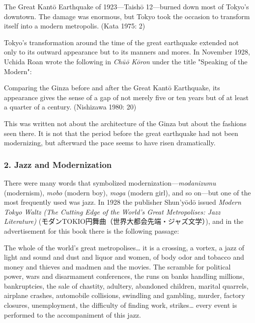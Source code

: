 \begin{gquote}
The Great Kantō Earthquake of 1923—Taishō 12—burned down most of Tokyo's downtown. The damage was enormous, but Tokyo took the occasion to transform itself into a modern metropolis. (Kata 1975: 2)
\end{gquote}

Tokyo's transformation around the time of the great earthquake extended not only to its outward appearance but to its manners and mores. In November 1928, Uchida Roan wrote the following in \textit{Chūō Kōron} under the title "Speaking of the Modern":

\begin{gquote}
Comparing the Ginza before and after the Great Kantō Earthquake, its appearance gives the sense of a gap of not merely five or ten years but of at least a quarter of a century. (Nishizawa 1980: 20)
\end{gquote}

This was written not about the architecture of the Ginza but about the fashions seen there. It is not that the period before the great earthquake had not been modernizing, but afterward the pace seems to have risen dramatically.

\subsubsection{2. Jazz and Modernization}

There were many words that symbolized modernization—\textit{modanizumu} (modernism), \textit{mobo} (modern boy), \textit{moga} (modern girl), and so on—but one of the most frequently used was jazz. In 1928 the publisher Shun'yōdō issued \textit{Modern Tokyo Waltz (The Cutting Edge of the World's Great Metropolises: Jazz Literature)} (モダンTOKIO円舞曲（世界大都会先端・ジャズ文学）), and in the advertisement for this book there is the following passage:

\begin{gquote}
The whole of the world's great metropolises… it is a crossing, a vortex, a jazz of light and sound and dust and liquor and women, of body odor and tobacco and money and thieves and madmen and the movies. The scramble for political power, wars and disarmament conferences, the runs on banks handling millions, bankruptcies, the sale of chastity, adultery, abandoned children, marital quarrels, airplane crashes, automobile collisions, swindling and gambling, murder, factory closures, unemployment, the difficulty of finding work, strikes… every event is performed to the accompaniment of this jazz.
\end{gquote}

